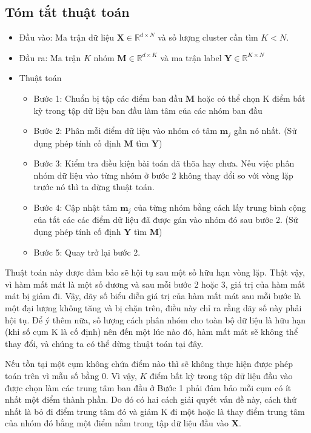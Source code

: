 \documentclass{article}
\begin{document}
	\subsection{Tóm tắt thuật toán} %
	\label{sub:tóm_tắt_thuật_toán}
	\begin{itemize}
		\item Đầu vào: Ma trận dữ liệu $\mathbf{X}\in\mathds{R}^{d\times N}$ và số lượng cluster cần tìm $K < N$.
		\item Đầu ra: Ma trận $K$ nhóm $\mathbf{M}\in\mathds{R}^{d\times K}$ và ma trận label $\mathbf{Y}\in\mathds{R}^{K\times N}$
		\item Thuật toán
		\begin{itemize}
			\item Bước 1: Chuẩn bị tập các điểm ban đầu $\mathbf{M}$ hoặc có thể chọn K điểm bất kỳ trong tập dữ liệu ban đầu làm tâm của các nhóm ban đầu
			\item Bước 2: Phân mỗi điểm dữ liệu vào nhóm có tâm $\mathbf{m}_j$ gần nó nhất. (Sử dụng phép tính cố định $\mathbf{M}$ tìm $\mathbf{Y}$)
			\item Bước 3: Kiểm tra điều kiện bài toán đã thõa hay chưa. Nếu việc phân nhóm dữ liệu vào từng nhóm ở bước 2 không thay đổi so với vòng lặp trước nó thì ta dừng thuật toán.
			\item Bước 4: Cập nhật tâm $\mathbf{m}_j$ của từng nhóm bằng cách lấy trung bình cộng của tất các các điểm dữ liệu đã được gán vào nhóm đó sau bước 2. (Sử dụng phép tính cố định $\mathbf{Y}$ tìm $\mathbf{M}$)
			\item Bước 5: Quay trở lại bước 2.
		\end{itemize}
	\end{itemize}

	Thuật toán này được đảm bảo sẽ hội tụ sau một số hữu hạn vòng lặp. Thật vậy, vì hàm mất
mát là một số dương và sau mỗi bước 2 hoặc 3, giá trị của hàm mất mát bị giảm đi. Vậy,
dãy số biểu diễn giá trị của hàm mất mát sau mỗi bước là một đại lượng không tăng và bị
chặn trên, điều này chỉ ra rằng dãy số này phải hội tụ. Để ý thêm nữa, số lượng cách phân
nhóm cho toàn bộ dữ liệu là hữu hạn (khi số cụm K là cố định) nên đến một lúc nào đó,
hàm mất mát sẽ không thể thay đổi, và chúng ta có thể dừng thuật toán tại đây.

Nếu tồn tại một cụm không chứa điểm nào thì sẽ không thực hiện được phép toán trên vì mẫu số bằng 0. Vì vậy, $K$ điểm bất kỳ trong tập dữ liệu đầu vào được chọn làm các
trung tâm ban đầu ở Bước 1 phải đảm bảo mỗi cụm có ít nhất một điểm thành phần. Do đó có hai cách giải quyết vấn đề này, cách
thứ nhất là bỏ đi điểm trung tâm đó và giảm K đi một hoặc là thay điểm trung tâm của nhóm đó bằng một điểm nằm trong tập dữ liệu đầu vào $\mathbf{X}$.
\end{document}
